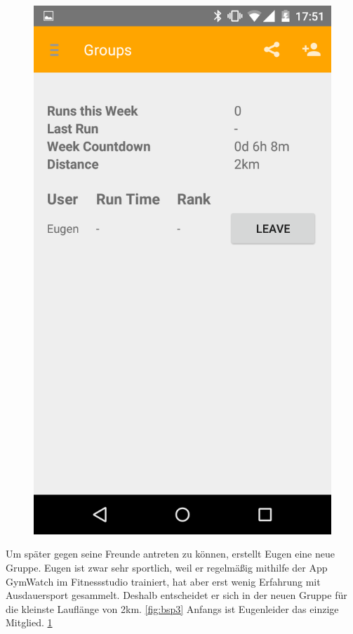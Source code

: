 \begin{figure}
\begin{minipage}{.4\textwidth}
  \includegraphics[width=.8\linewidth]{abb/bsp/bsp4}
  \label{fig:bsp4}
\end{minipage}
\end{figure}

Um später gegen seine Freunde antreten zu können, erstellt Eugen eine neue Gruppe. Eugen ist zwar sehr sportlich, weil er regelmäßig mithilfe der App GymWatch im Fitnessstudio trainiert, hat aber erst wenig Erfahrung mit Ausdauersport gesammelt. Deshalb entscheidet er sich in der neuen Gruppe für die kleinste Lauflänge von 2km. \ref{fig:bsp3} Anfangs ist Eugenleider das einzige Mitglied. \ref{fig:bsp4} 

